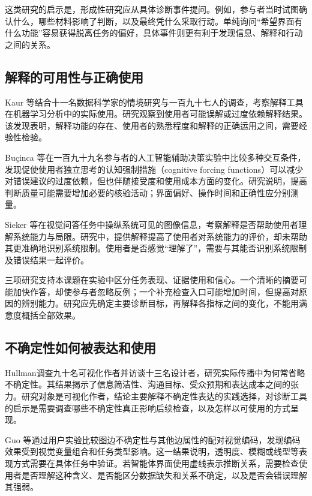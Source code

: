 这类研究的启示是，形成性研究应从具体诊断事件提问。例如，参与者当时试图确认什么，哪些材料影响了判断，以及最终凭什么采取行动。单纯询问“希望界面有什么功能”容易获得脱离任务的偏好，具体事件则更有利于发现信息、解释和行动之间的关系。

\subsection{解释的可用性与正确使用}

Kaur 等\cite{ref50}结合十一名数据科学家的情境研究与一百九十七人的调查，考察解释工具在机器学习分析中的实际使用。研究观察到使用者可能误解或过度依赖解释结果。该发现表明，解释功能的存在、使用者的熟悉程度和解释的正确运用之间，需要经验性检验。

Buçinca 等\cite{ref55}在一百九十九名参与者的人工智能辅助决策实验中比较多种交互条件，发现促使使用者独立思考的认知强制措施（cognitive forcing functions）可以减少对错误建议的过度依赖，但也伴随接受度和使用成本方面的变化。研究说明，提高判断质量可能需要增加必要的核验活动；界面偏好、操作时间和正确性应分别测量。

Sieker 等\cite{ref56}在视觉问答任务中操纵系统可见的图像信息，考察解释是否帮助使用者理解系统能力与局限。研究中，提供解释提高了使用者对系统能力的评价，却未帮助其更准确地识别系统限制。使用者是否感觉“理解了”，需要与其能否识别系统限制及错误结果一起评价。

三项研究支持本课题在实验中区分任务表现、证据使用和信心。一个清晰的摘要可能加快作答，却使参与者忽略反例；一个补充检查入口可能增加时间，但提高对原因的辨别能力。研究应先确定主要诊断目标，再解释各指标之间的变化，不能用满意度概括全部效果。

\subsection{不确定性如何被表达和使用}

Hullman\cite{ref40}调查九十名可视化作者并访谈十三名设计者，研究实际传播中为何常省略不确定性。其结果揭示了信息简洁性、沟通目标、受众预期和表达成本之间的张力。研究对象是可视化作者，结论主要解释不确定性表达的实践选择，对诊断工具的启示是需要调查哪些不确定性真正影响后续检查，以及怎样以可使用的方式呈现。

Guo 等\cite{ref62}通过用户实验比较图边不确定性与其他边属性的配对视觉编码，发现编码效果受到视觉变量组合和任务类型影响。这一结果说明，透明度、模糊或线型等表现方式需要在具体任务中验证。若智能体界面使用虚线表示推断关系，需要检查使用者是否理解这种含义、是否能区分数据缺失和关系不确定，以及是否会错误理解其强弱。

